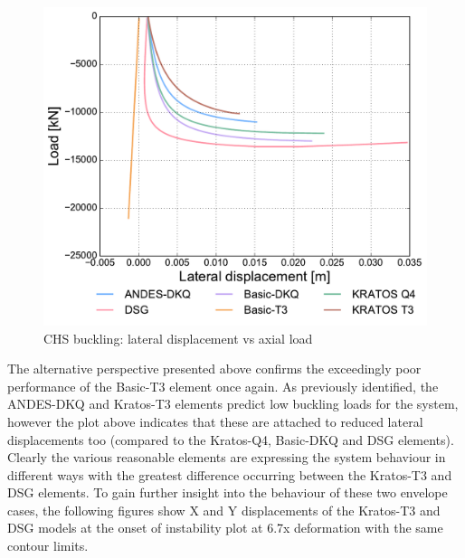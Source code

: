 \begin{figure}[H]
	\centering
	\def\svgwidth{\columnwidth}
	\includegraphics[width=12cm]{images/stability_chs_trans_disp.pdf}
	\caption{CHS buckling: lateral displacement vs axial load}
	\label{pic:eulerchs2}
\end{figure}

The alternative perspective presented above confirms the exceedingly poor performance of the Basic-T3 element once again. As previously identified, the ANDES-DKQ and Kratos-T3 elements predict low buckling loads for the system, however the plot above indicates that these are attached to reduced lateral displacements too (compared to the Kratos-Q4, Basic-DKQ and DSG elements). Clearly the various reasonable elements are expressing the system behaviour in different ways with the greatest difference occurring between the Kratos-T3 and DSG elements. To gain further insight into the behaviour of these two envelope cases, the following figures show X and Y displacements of the Kratos-T3 and DSG models at the onset of instability plot at 6.7x deformation with the same contour limits.

